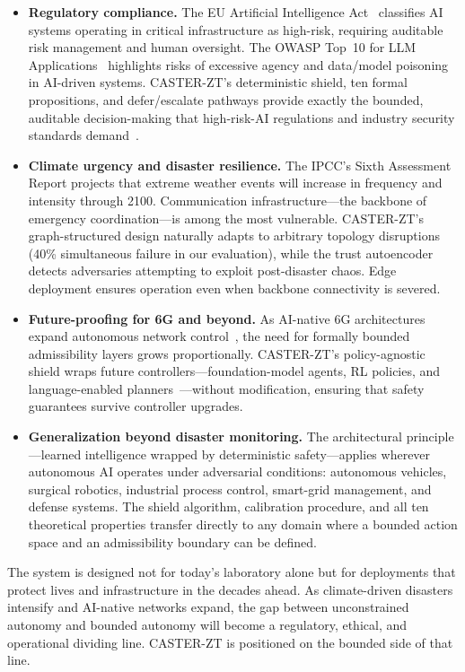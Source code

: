 \documentclass[10pt,journal,compsoc]{IEEEtran}
\begin{document}
\begin{itemize}
    \item \textbf{Regulatory compliance.}  The EU Artificial Intelligence Act~\cite{euaiact2024} classifies AI systems operating in critical infrastructure as high-risk, requiring auditable risk management and human oversight.  The OWASP Top~10 for LLM Applications~\cite{owasp2025llm} highlights risks of excessive agency and data/model poisoning in AI-driven systems.  CASTER-ZT's deterministic shield, ten formal propositions, and defer/escalate pathways provide exactly the bounded, auditable decision-making that high-risk-AI regulations and industry security standards demand~\cite{nist2023airisk}.
    \item \textbf{Climate urgency and disaster resilience.}  The IPCC's Sixth Assessment Report projects that extreme weather events will increase in frequency and intensity through 2100.  Communication infrastructure---the backbone of emergency coordination---is among the most vulnerable.  CASTER-ZT's graph-structured design naturally adapts to arbitrary topology disruptions (40\% simultaneous failure in our evaluation), while the trust autoencoder detects adversaries attempting to exploit post-disaster chaos.  Edge deployment ensures operation even when backbone connectivity is severed.
    \item \textbf{Future-proofing for 6G and beyond.}  As AI-native 6G architectures expand autonomous network control~\cite{saad2020vision6g,letaief2019roadmap6g}, the need for formally bounded admissibility layers grows proportionally.  CASTER-ZT's policy-agnostic shield wraps future controllers---foundation-model agents, RL policies, and language-enabled planners~\cite{toward_autonomous_oran_2026,lee2024llmran}---without modification, ensuring that safety guarantees survive controller upgrades.
    \item \textbf{Generalization beyond disaster monitoring.}  The architectural principle---learned intelligence wrapped by deterministic safety---applies wherever autonomous AI operates under adversarial conditions: autonomous vehicles, surgical robotics, industrial process control, smart-grid management, and defense systems.  The shield algorithm, calibration procedure, and all ten theoretical properties transfer directly to any domain where a bounded action space and an admissibility boundary can be defined.
\end{itemize}
The system is designed not for today's laboratory alone but for deployments that protect lives and infrastructure in the decades ahead.
As climate-driven disasters intensify and AI-native networks expand, the gap between unconstrained autonomy and bounded autonomy will become a regulatory, ethical, and operational dividing line.
CASTER-ZT is positioned on the bounded side of that line.
\end{document}
